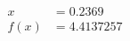 \documentclass[preview]{standalone}
\begin{document}
\begin{align*}
x &= 0.2369\\f(x) &= 4.4137257
\end{align*}
\end{document}
